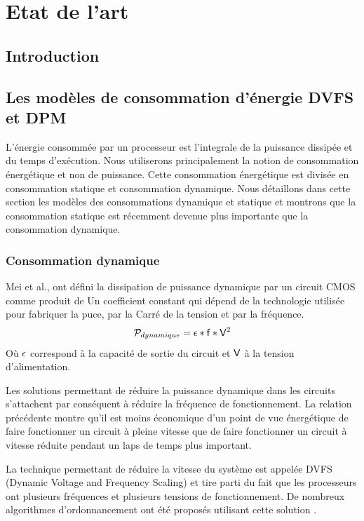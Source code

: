 \chapter{Etat de l'art}
\minitoc
\section{Introduction}
\section{Les modèles de consommation d'énergie DVFS et DPM}
L’énergie consommée par un processeur est l'integrale de
la puissance dissipée et du temps d’exécution. Nous utiliserons
principalement la notion de consommation énergétique et non de
puissance. Cette consommation énergétique est divisée en consommation
statique et consommation dynamique. Nous détaillons dans cette section
les modèles des consommations dynamique et statique et montrons que la
consommation statique est récemment devenue plus importante que la
consommation dynamique.
\subsection{Consommation dynamique}

Mei et al.\cite{Mei13}, ont défini la dissipation de puissance
dynamique par un circuit CMOS comme produit de Un coefficient constant
qui dépend de la technologie utilisée pour fabriquer la puce, par la
Carré de la tension et par la fréquence.
\begin{equation}
\pow_{dynamique} = \coeff * \freq * \volt^2 
\end{equation}
Où $\coeff$ correspond à la capacité de sortie du circuit et $\volt$ à
la tension d’alimentation.

Les solutions permettant de réduire la puissance dynamique dans les
circuits s’attachent par conséquent à réduire la fréquence de
fonctionnement. La relation précédente montre qu’il est moins
économique d’un point de vue énergétique de faire fonctionner un
circuit à pleine vitesse que de faire fonctionner un circuit à vitesse
réduite pendant un laps de temps plus important.

La technique permettant de réduire la vitesse du système est appelée
DVFS (Dynamic Voltage and Frequency Scaling) et tire parti du fait que
les processeurs ont plusieurs fréquences et plusieurs tensions de
fonctionnement. De nombreux algorithmes d’ordonnancement ont été
proposés utilisant cette solution \cite{WWDS94, YDS95, PS01}.
